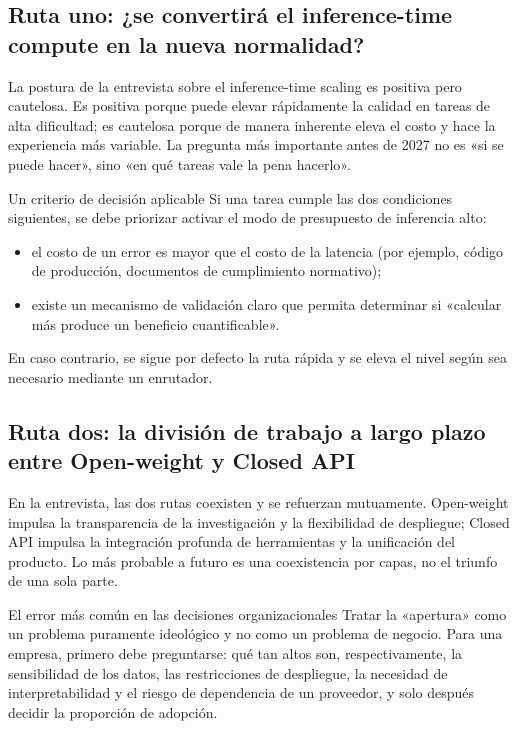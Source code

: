 \documentclass[a4paper]{article}
\begin{document}
\subsection{Ruta uno: ¿se convertirá el inference-time compute en la nueva normalidad?}

La postura de la entrevista sobre el inference-time scaling es positiva pero cautelosa. Es positiva porque puede elevar rápidamente la calidad en tareas de alta dificultad; es cautelosa porque de manera inherente eleva el costo y hace la experiencia más variable. La pregunta más importante antes de 2027 no es «si se puede hacer», sino «en qué tareas vale la pena hacerlo».

\begin{importantbox}{Un criterio de decisión aplicable}
Si una tarea cumple las dos condiciones siguientes, se debe priorizar activar el modo de presupuesto de inferencia alto:
\begin{itemize}[leftmargin=1.5em]
    \item el costo de un error es mayor que el costo de la latencia (por ejemplo, código de producción, documentos de cumplimiento normativo);
    \item existe un mecanismo de validación claro que permita determinar si «calcular más produce un beneficio cuantificable».
\end{itemize}
En caso contrario, se sigue por defecto la ruta rápida y se eleva el nivel según sea necesario mediante un enrutador.
\end{importantbox}

\subsection{Ruta dos: la división de trabajo a largo plazo entre Open-weight y Closed API}

En la entrevista, las dos rutas coexisten y se refuerzan mutuamente. Open-weight impulsa la transparencia de la investigación y la flexibilidad de despliegue; Closed API impulsa la integración profunda de herramientas y la unificación del producto. Lo más probable a futuro es una coexistencia por capas, no el triunfo de una sola parte.

\begin{warningbox}{El error más común en las decisiones organizacionales}
Tratar la «apertura» como un problema puramente ideológico y no como un problema de negocio. Para una empresa, primero debe preguntarse: qué tan altos son, respectivamente, la sensibilidad de los datos, las restricciones de despliegue, la necesidad de interpretabilidad y el riesgo de dependencia de un proveedor, y solo después decidir la proporción de adopción.
\end{warningbox}
\end{document}
